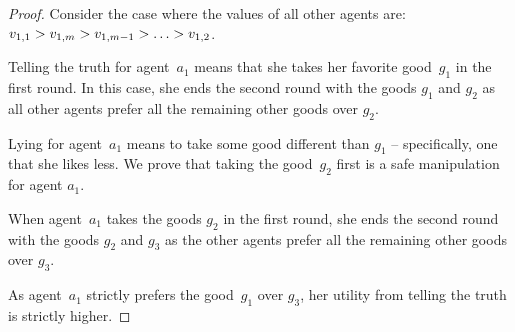 \begin{proof}
    Consider the case where the values of all other agents are: $v_{1,1} > v_{1,m} > v_{1,m-1} > \ldots > v_{1,2}$.

    Telling the truth for agent~$a_1$ means that she takes her favorite good~$g_1$ in the first round. In this case, she ends the second round with the goods $g_1$ and $g_2$ as all other agents prefer all the remaining other goods over $g_2$.

    Lying for agent~$a_1$ means to take some good different than $g_1$ -- specifically, one that she likes less. We prove that taking the good~$g_2$ first is a safe manipulation for agent $a_1$.
    
    When agent~$a_1$ takes the goods $g_2$ in the first round, she ends the second round with the goods $g_2$ and $g_3$ as the other agents prefer all the remaining other goods over $g_3$. 

    As agent~$a_1$ strictly prefers the good~$g_1$ over $g_3$, her utility from telling the truth is strictly higher. 
    
\end{proof}



